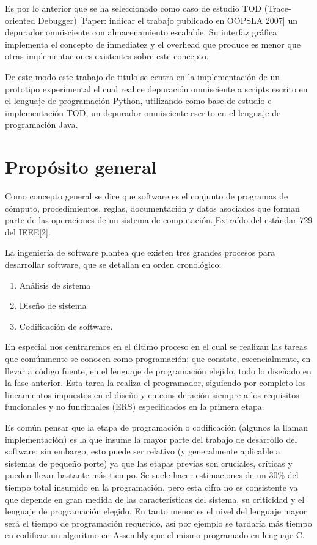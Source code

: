 \documentclass[12pt,legalpaper]{report}
\begin{document}
Es por lo anterior que se ha seleccionado como caso de estudio TOD (Trace-oriented Debugger) [Paper: indicar el trabajo publicado en OOPSLA 2007] un depurador omnisciente con almacenamiento escalable.  Su interfaz gráfica implementa el concepto de inmediatez y el overhead que produce es menor que otras implementaciones existentes sobre este concepto.

De este modo este trabajo de titulo se centra en la implementación de un prototipo experimental el cual realice depuración omnisciente a scripts escrito en el lenguaje de programación Python, utilizando como base de estudio e implementación TOD, un depurador omnisciente escrito en el lenguaje de programación Java.

\chapter{Propósito general}

Como concepto general se dice que software es el conjunto de programas de cómputo, procedimientos, reglas, documentación y datos asociados que forman parte de las operaciones de un sistema de computación.[Extraído del estándar 729 del IEEE[2].

La ingeniería de software plantea que existen tres grandes procesos para desarrollar software, que se detallan en orden cronológico:
\begin{enumerate}
	\item Análisis de sistema
	\item Diseño de sistema
	\item Codificación de software.
\end{enumerate}

En especial nos centraremos en el último proceso en el cual se realizan las tareas que comúnmente se conocen como programación; que consiste, escencialmente, en llevar a código fuente, en el lenguaje de programación elejido, todo lo diseñado en la fase anterior. Esta tarea la realiza el programador, siguiendo por completo los lineamientos impuestos en el diseño y en consideración siempre a los requisitos funcionales y no funcionales (ERS) especificados en la primera etapa.

Es común pensar que la etapa de programación o codificación (algunos la llaman implementación) es la que insume la mayor parte del trabajo de desarrollo del software; sin embargo, esto puede ser relativo (y generalmente aplicable a sistemas de pequeño porte) ya que las etapas previas son cruciales, críticas y pueden llevar bastante más tiempo. Se suele hacer estimaciones de un 30\% del tiempo total insumido en la programación, pero esta cifra no es consistente ya que depende en gran medida de las características del sistema, su criticidad y el lenguaje de programación elegido. En tanto menor es el nivel del lenguaje mayor será el tiempo de programación requerido, así por ejemplo se tardaría más tiempo en codificar un algoritmo en Assembly que el mismo programado en lenguaje C.
\end{document}
